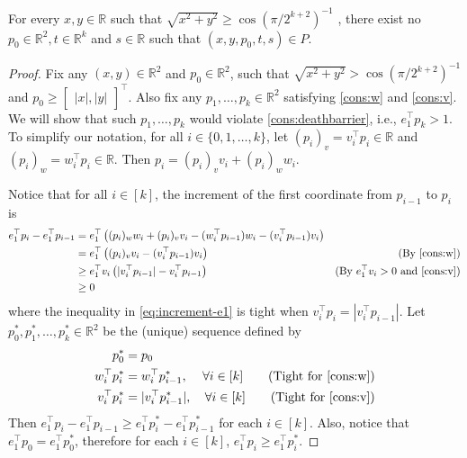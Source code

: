 \documentclass{article}\usepackage[a4paper,margin=20mm]{geometry}
\newcommand{\R}{\mathbb R}
\begin{document}
\begin{lemma}\label{lem:outerdisk}
For every $x,y \in \R$ such that $\sqrt{x^2+y^2} \geq \cos(\pi/2^{k+2})^{-1}$ , there exist no
$p_0 \in \R^2, t \in \R^k$ and $s \in \R$ such that $(x,y,p_0,t,s) \in P$.
\end{lemma}
\begin{proof}
Fix any $(x, y) \in \R^2$ and $p_0 \in \R^2$, such that $\sqrt{x^2 + y^2} > \cos(\pi/2^{k+2})^{-1}$ and $p_0 \geq \begin{bmatrix}|x|, |y| \end{bmatrix}^\top$. 
Also fix any $p_1, \ldots, p_k \in \R^2$ satisfying \eqref{cons:w} and \eqref{cons:v}. We will show that such $p_1, \ldots, p_k$ would violate \eqref{cons:deathbarrier}, i.e., $e_1^\top p_k > 1$.  To simplify our notation, for all $i \in \{0, 1, \ldots, k\}$, let $(p_i)_v = v_i^\top p_i \in \R$ and $(p_i)_w = w_i^\top p_i \in \R$. Then $p_i = (p_i)_v v_i + (p_i)_w w_i$.

Notice that for all $i \in [k]$, the increment of the first coordinate from $p_{i-1}$ to $p_i$ is
\begin{align}\label{eq:increment-e1}
    e_1^\top p_i - e_1^\top p_{i-1} &= e_1^\top \left( (p_i)_w w_i + (p_i)_v v_i - (w_i^\top p_{i-1})w_i - (v_i^\top p_{i-1})v_i  \right) \nonumber \\
    &= e_1^\top \left( (p_i)_v v_i - (v_i^\top p_{i-1})v_i  \right) & (\text{By \eqref{cons:w}}) \nonumber \\
    &\geq e_1^\top v_i \left( |v_i^\top p_{i-1}| - v_i^\top p_{i-1} \right) & (\text{By $e_1^\top v_i > 0$ and \eqref{cons:v}}) \\
    &\geq 0 \nonumber
\end{align}
where the inequality in \eqref{eq:increment-e1} is tight when $v_i^\top p_i = |v_i^\top p_{i-1}|$.
Let $p_0^*, p_1^*, \ldots, p_k^*\in\R^2$ be the (unique) sequence defined by
\begin{align*}
    p_0^* &= p_0 \\
    w_i^\top p_i^* &= w_i^\top p_{i-1}^*, & \forall i\in [k] \tag{Tight for \eqref{cons:w}} \\
    v_i^\top p_i^* &= |v_i^\top p_{i-1}^*|, & \forall i\in [k] \tag{Tight for \eqref{cons:v}}
\end{align*}
Then $e_1^\top p_i - e_1^\top p_{i-1} \geq e_1^\top p_i^* - e_1^\top p_{i-1}^*$ for each $i \in [k]$. Also, notice that $e_1^\top p_0 = e_1^\top p_0^*$, therefore for each $i \in [k]$, $e_1^\top p_i \geq e_1^\top p_i^*$.


\end{proof}
\end{document}
